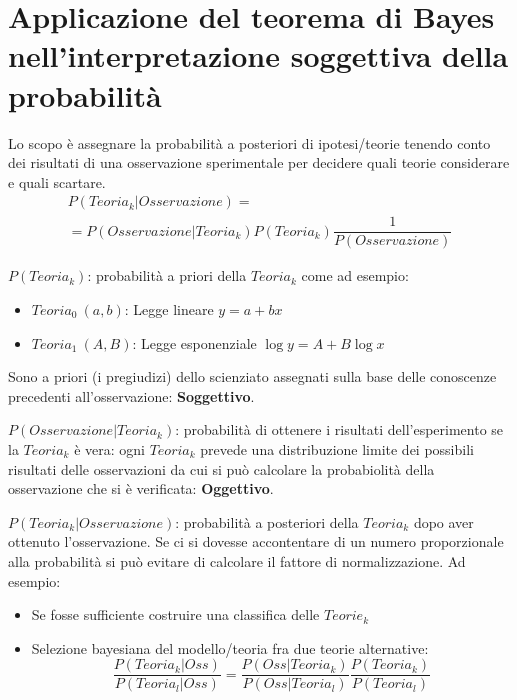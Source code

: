 \documentclass[11pt,a4paper]{book}
\begin{document}
\section[Teorema di Bayes e interpretazione soggettiva]{Applicazione del teorema di Bayes nell'interpretazione soggettiva della probabilità} 
Lo scopo è assegnare la probabilità a posteriori di ipotesi/teorie tenendo conto dei risultati di una osservazione sperimentale per decidere quali teorie considerare e quali scartare.
\begin{multline}
P(\textit{Teoria}_k| \textit{Osservazione}) = \\=P(\textit{Osservazione}|\textit{Teoria}_k)P(\textit{Teoria}_k)\dfrac{1}{P(\textit{Osservazione})}
\end{multline}
\begin{description}
\item $ P(\textit{Teoria}_k) $: probabilità a priori della $ \textit{Teoria}_k $ come ad esempio:
\begin{itemize}
\item $ \textit{Teoria}_0 \ (a,b)$: Legge lineare $ y = a +bx $
\item $ \textit{Teoria}_1 \ (A,B)$: Legge esponenziale $ \log y = A +B\log x $
\end{itemize}
Sono a priori (i pregiudizi) dello scienziato assegnati sulla base delle conoscenze precedenti all'osservazione: \textbf{Soggettivo}.
\item $ P(\textit{Osservazione}|\textit{Teoria}_k) $: probabilità di ottenere i risultati dell'esperimento se la $ \textit{Teoria}_k $ è vera: ogni $ \textit{Teoria}_k $ prevede una distribuzione limite dei possibili risultati delle osservazioni da cui si può calcolare la probabiolità della osservazione che si è verificata: \textbf{Oggettivo}.
\item $P(\textit{Teoria}_k| \textit{Osservazione})  $: probabilità a posteriori della $ \textit{Teoria}_k $ dopo aver ottenuto l'osservazione. Se ci si dovesse accontentare di un numero proporzionale alla probabilità si può evitare di calcolare il fattore di normalizzazione. Ad esempio:
\begin{itemize}
\item Se fosse sufficiente costruire una classifica delle $ \textit{Teorie}_k $
\item Selezione bayesiana del modello/teoria fra due teorie alternative:
\begin{equation}
\frac{ P(\textit{Teoria}_k | \textit{Oss})}{P(\textit{Teoria}_l | \textit{Oss})} = \frac{P(\textit{Oss}|\textit{Teoria}_k)}{P(\textit{Oss}|\textit{Teoria}_l)} \frac{P(\textit{Teoria}_k)}{P(\textit{Teoria}_l)}

\end{equation}
\end{itemize}
\end{description}
\end{document}

